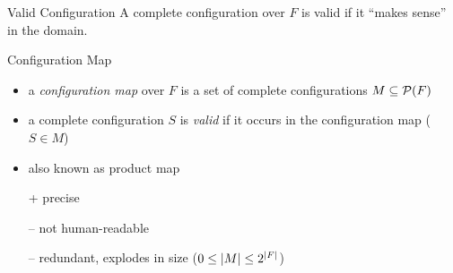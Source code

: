 \begin{frame}{\myframetitle}\label{frame:cfgmap}
	\begin{fancycolumns}
		\begin{note}{Valid Configuration}
			A complete configuration over $F$ is valid if it ``makes sense'' in the domain.
			\emph{\color{lecturered}{$\leadsto$ ``makes sense''?}}
		\end{note}

		\begin{definition}{Configuration Map}
			\begin{itemize}
				\item a \emph{configuration map} over $F$ is a set of complete configurations $M \subseteq \mathcal{P}(F)$
				\item a complete configuration $S$ is \emph{valid} if it occurs in the configuration map ($S \in M$)
				\item also known as product map
				\item[+] precise
				\item[--] not human-readable
				\item[--] redundant, explodes in size ($0 \leq \lvert M\rvert \leq 2^{\lvert F\rvert}$)
			\end{itemize}
		\end{definition}
	\nextcolumn
	\end{fancycolumns}
\end{frame}

